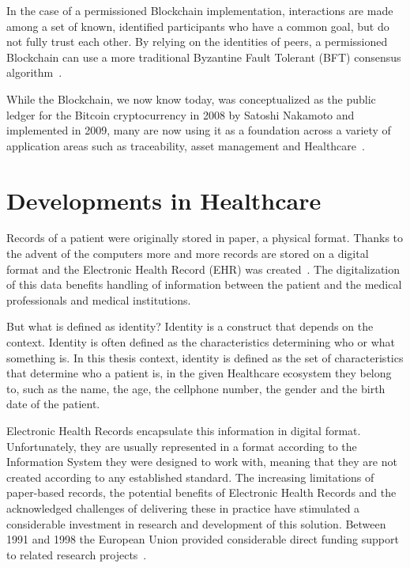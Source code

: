 In the case of a permissioned Blockchain implementation, interactions are made
among a set of known, identified participants who have a common goal, but do
not fully trust each other. By relying on the identities of peers, a
permissioned Blockchain can use a more traditional Byzantine Fault Tolerant
(BFT) consensus algorithm~\cite{Sousa2018}.

While the Blockchain, we now know today, was conceptualized as the public
ledger for the Bitcoin cryptocurrency in 2008 by Satoshi Nakamoto and
implemented in 2009, many are now using it as a foundation across a variety of
application areas such as traceability, asset management and
Healthcare~\cite{MIT2016}.

\section{Developments in Healthcare} \label{blockchainHealthcare}

Records of a patient were originally stored in paper, a physical format.
Thanks to the advent of the computers more and more records are stored on a
digital format and the Electronic Health Record (EHR) was
created~\cite{Marquez2017}. The digitalization of this data benefits handling
of information between the patient and the medical professionals and medical
institutions\cite{ONCoordinator2017}.

But what is defined as identity? Identity is a construct that depends on the
context. Identity is often defined as the characteristics determining who or
what something is. In this thesis context, identity is defined as the set of
characteristics that determine who a patient is, in the given Healthcare
ecosystem they belong to, such as the name, the age, the cellphone number, the
gender and the birth date of the patient.  

Electronic Health Records encapsulate this information in digital format.
Unfortunately, they are usually represented in a format according to the
Information System they were designed to work with, meaning that they are not
created according to any established standard. The increasing limitations of
paper-based records, the potential benefits of Electronic Health Records and
the acknowledged challenges of delivering these in practice have stimulated a
considerable investment in research and development of this solution.  Between
1991 and 1998 the European Union provided considerable direct funding support
to related research projects~\cite{Kalra2006}.

